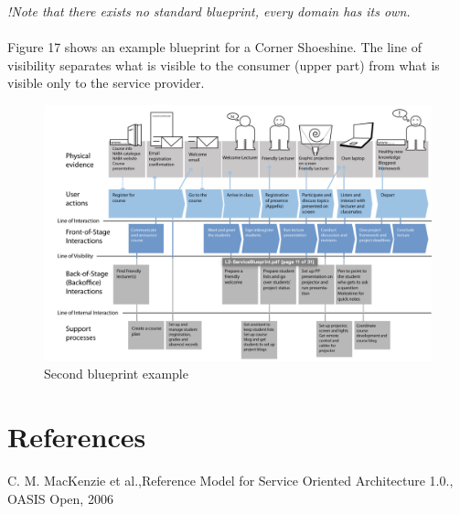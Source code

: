 \documentclass[10pt,a4paper]{article}
\begin{document}
\textit{!Note that there exists no standard blueprint, every domain has its own.} 
\\ \\
Figure 17 shows an example blueprint for a Corner Shoeshine. The line of visibility separates what is visible to the consumer (upper part) from what is visible only to the service provider.
\begin{figure}[ht!]
 \hfill \includegraphics[width=400pt]{images/second-service-blueprint}\hspace*{\fill}
 \caption{Second blueprint example}
  \label{fig:second-blueprint}
\end{figure}
\clearpage
\section{\LARGE References}
\begin{enumerate}[label={[\arabic*]}]
  \item C. M. MacKenzie et al.,Reference Model for Service Oriented
Architecture 1.0., OASIS Open, 2006
\end{enumerate}
\end{document}
